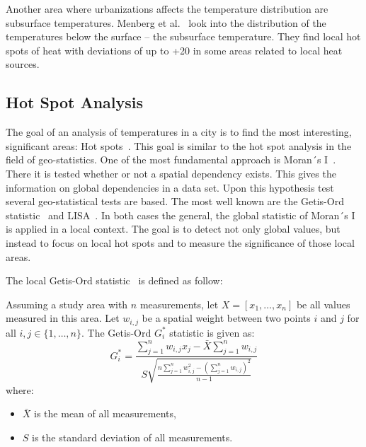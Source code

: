 \documentclass{itatnew}
\begin{document}
Another area where urbanizations affects the temperature distribution are
subsurface temperatures. Menberg et al.~\cite{Menberg.2013} look into the
distribution of the temperatures below the surface -- the subsurface
temperature. They find local hot spots of heat with deviations of up to
+20 in some areas related to local heat sources.

\subsection{Hot Spot Analysis}

The goal of an analysis of temperatures in a city is to find the most
interesting, significant areas: Hot spots~\cite{Martin.2015}. This goal is
similar to the hot spot analysis in the field of geo-statistics. One of the most
fundamental approach is Moran´s I~\cite{MoranI}. There it is tested whether or
not a spatial dependency exists. This gives the information on global
dependencies in a data set. Upon this hypothesis test several geo-statistical
tests are based. The most well known are the Getis-Ord statistic~\cite{Ord.1995}
and LISA~\cite{Anselin.1995}. In both cases the general, the global statistic of
Moran´s I is applied in a local context. The goal is to detect not only global
values, but instead to focus on local hot spots and to measure the significance
of those local areas.

The local Getis-Ord statistic~\cite{Ord.1995} is defined as follow:
\begin{definition} \label{def:Gstar}
  Assuming a study area with $n$ measurements, let $X = [x_1, \ldots,
  x_n]$ be all values measured in this area. Let $w_{i,j}$ be a spatial weight
  between two points $i$ and $j$ for all $i,j \in \{ 1, \ldots, n\}$. The 
  Getis-Ord $G^*_i$ statistic is given as:
  \begin{equation} \label{eq:Gstar}
  G^*_i = \frac{
    \sum_{j=1}^{n}w_{i,j}x_j - \bar{X}\sum_{j=1}^{n}w_{i,j}
  }{
  S \sqrt{
    \frac{
      n \sum_{j=1}^{n}w_{i,j}^2 - (\sum_{j=1}^{n}w_{i,j})^2
    }{n-1}
  }
}
\end{equation}
where:
\begin{itemize}
  \item $\bar{X}$ is the mean of all measurements,
  \item $S$ is the standard deviation of all measurements.
\end{itemize}
\end{definition}
\end{document}
